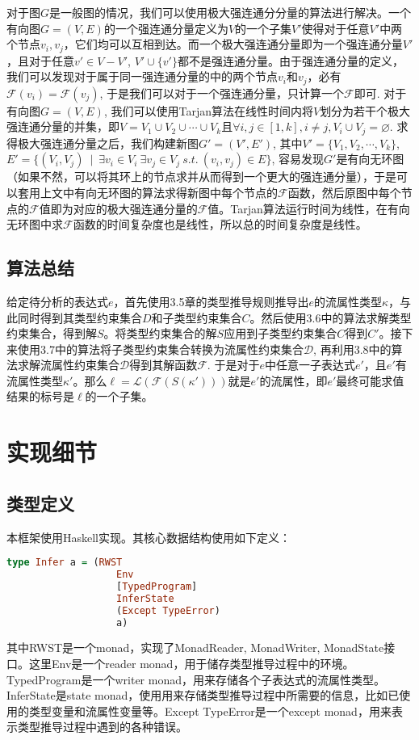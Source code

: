 \documentclass[12pt, titlepage]{article}
\let\emptyset\varnothing
\begin{document}
	对于图$G$是一般图的情况，我们可以使用极大强连通分分量的算法进行解决\cite{tarjan}。一个有向图$G = (V, E)$的一个强连通分量定义为$V$的一个子集$V'$使得对于任意$V'$中两个节点$v_i, v_j$，它们均可以互相到达。而一个极大强连通分量即为一个强连通分量$V'$，且对于任意$v'\in V - V'$, $V'\cup\{v'\}$都不是强连通分量。由于强连通分量的定义，我们可以发现对于属于同一强连通分量的中的两个节点$v_i$和$v_j$，必有$\mathcal{F}(v_i) = \mathcal{F}(v_j)$, 于是我们可以对于一个强连通分量，只计算一个$\mathcal{F}$即可. 对于有向图$G = (V, E)$, 我们可以使用Tarjan算法在线性时间内将$V$划分为若干个极大强连通分量的并集，即$V = V_1\cup V_2\cup \cdots\cup V_k$且$\forall i, j \in [1, k], i \not= j, V_i\cup V_j = \emptyset$. 求得极大强连通分量之后，我们构建新图$G' = (V', E')$, 其中$V' = \{V_1, V_2, \cdots, V_k\}$, $E' =  \{(V_i, V_j)\ \mid\ \exists v_i\in V_i\ \exists v_j\in V_j\ s.t.\ (v_i, v_j)\in E\}$, 容易发现$G'$是有向无环图（如果不然，可以将其环上的节点求并从而得到一个更大的强连通分量），于是可以套用上文中有向无环图的算法求得新图中每个节点的$\mathcal{F}$函数，然后原图中每个节点的$\mathcal{F}$值即为对应的极大强连通分量的$\mathcal{F}$值。Tarjan算法运行时间为线性，在有向无环图中求$\mathcal{F}$函数的时间复杂度也是线性，所以总的时间复杂度是线性。
	
	\subsection{算法总结}
	给定待分析的表达式$e$，首先使用3.5章的类型推导规则推导出$e$的流属性类型$\kappa$，与此同时得到其类型约束集合$D$和子类型约束集合$C$。然后使用3.6中的算法求解类型约束集合，得到解$S$。将类型约束集合的解$S$应用到子类型约束集合$C$得到$C'$。接下来使用3.7中的算法将子类型约束集合转换为流属性约束集合$\mathcal{D}$, 再利用3.8中的算法求解流属性约束集合$\mathcal{D}$得到其解函数$\mathcal{F}$. 于是对于$e$中任意一子表达式$e'$，且$e'$有流属性类型$\kappa'$。那么$\ell = \mathcal{L}(\mathcal{F}(S(\kappa')))$就是$e'$的流属性，即$e'$最终可能求值结果的标号是$\ell$的一个子集。
	\newpage
	\section{实现细节}
	\subsection{类型定义}
	本框架使用Haskell实现。其核心数据结构使用如下定义：
	\begin{lstlisting}[language=haskell]
type Infer a = (RWST
                   Env                
                   [TypedProgram]    
                   InferState         
                   (Except TypeError) 
                   a)                 
	\end{lstlisting}
	其中RWST是一个monad，实现了MonadReader, MonadWriter, MonadState接口。这里Env是一个reader monad，用于储存类型推导过程中的环境。TypedProgram是一个writer monad，用来存储各个子表达式的流属性类型。InferState是state monad，使用用来存储类型推导过程中所需要的信息，比如已使用的类型变量和流属性变量等。Except TypeError是一个except monad，用来表示类型推导过程中遇到的各种错误。
	
\end{document}
